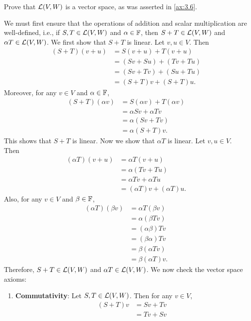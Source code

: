 \begin{exercise}
Prove that $\mathcal{L}(V,W)$ is a vector space, as was asserted in \ref{ax:3.6}.
\end{exercise}
\begin{solution}
We must first ensure that the operations of addition and scalar
multiplication are well-defined, i.e., if $S,T\in\mathcal{L}(V,W)$ and
$\alpha\in\mathbb{F}$, then $S+T\in\mathcal{L}(V,W)$ and $\alpha T\in\mathcal{L}(V,W)$. We first
show that $S+T$ is linear. Let $v,u\in V$. Then
\begin{align*}
(S+T)(v+u) &= S(v+u)+T(v+u)\\
  &= (Sv+Su)+(Tv+Tu)\\
  &= (Sv+Tv)+(Su+Tu)\\
  &= (S+T)v+(S+T)u.
\end{align*}
Moreover, for any $v\in V$ and $\alpha\in\mathbb{F}$,
\begin{align*}
(S+T)(\alpha v) &= S(\alpha v)+T(\alpha v)\\
  &= \alpha Sv+\alpha Tv\\
  &= \alpha(Sv+Tv)\\
  &= \alpha(S+T)v.
\end{align*}
This shows that $S+T$ is linear. Now we show that $\alpha T$ is linear. Let
$v,u\in V$. Then
\begin{align*}
(\alpha T)(v+u) &= \alpha T(v+u)\\
  &= \alpha(Tv+Tu)\\
  &= \alpha Tv+\alpha Tu\\
  &= (\alpha T)v+(\alpha T)u.
\end{align*}
Also, for any $v\in V$ and $\beta\in\mathbb{F}$,
\begin{align*}
(\alpha T)(\beta v) &= \alpha T(\beta v)\\
  &= \alpha(\beta Tv)\\
  &= (\alpha\beta)Tv\\
  &= (\beta\alpha)Tv\\
  &= \beta(\alpha Tv)\\
  &= \beta(\alpha T)v.
\end{align*}
Therefore, $S+T\in\mathcal{L}(V,W)$ and $\alpha T\in\mathcal{L}(V,W)$. We now check the
vector space axioms:
\begin{enumerate}[label=\arabic*)]
\item \textbf{Commutativity}: Let $S,T\in\mathcal{L}(V,W)$. Then for any $v\in V$,
  \begin{align*}
  (S+T)v &= Sv+Tv\\
    &= Tv+Sv\\

\end{align*}
\end{enumerate}
\end{solution}
